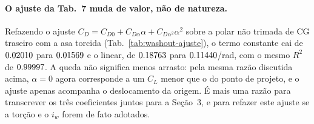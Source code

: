 \paragraph{O ajuste da Tab.~7 muda de valor, não de natureza.}
Refazendo o ajuste $C_D = C_{D0} + C_{D\alpha}\alpha + C_{D\alpha^2}\alpha^2$
sobre a polar não trimada de CG traseiro com a asa torcida
(Tab.~\ref{tab:washout-ajuste}), o termo constante cai de $0.02010$ para
$0.01569$ e o linear, de $0.18763$ para $0.11440$/rad, com o mesmo
$R^2$ de $0.99997$. A queda não significa menos arrasto: pela mesma razão
discutida acima, $\alpha = 0$ agora corresponde a um $C_L$ menor que o do ponto
de projeto, e o ajuste apenas acompanha o deslocamento da origem. É mais uma
razão para transcrever os três coeficientes juntos para a Seção~3, e para
refazer este ajuste se a torção e o $i_w$ forem de fato adotados.

\begin{table}[H]
\centering
\caption{Ajuste quadrático da polar não trimada de CG traseiro, com e sem
torção. O $\alpha$ é sempre o da fuselagem.}
\label{tab:washout-ajuste}

\end{table}
